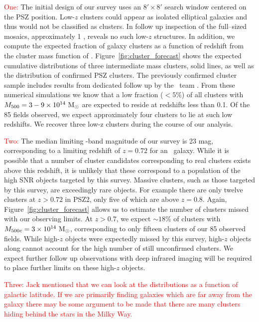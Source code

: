 \documentclass[apj, revtex4-1]{emulateapj}
\newcommand{\editorial}[1]{\textcolor{red}{#1}}
\begin{document}
\editorial{One:} The initial design of our survey uses an $8'\times8'$ search window centered on the PSZ position. Low-$z$ clusters could appear as isolated elliptical galaxies and thus would not be classified as clusters. In follow up inspection of the full--sized mosaics, approximately 1 \degsq, reveals no such low-$z$ structures. In addition, we compute the expected fraction of galaxy clusters as a function of redshift from the cluster mass function of \cite{Tinker2008}. Figure~\ref{fig:cluster_forecast} shows the expected cumulative distributions of three intermediate mass clusters, solid lines, as well as the distribution of confirmed PSZ clusters. The previously confirmed cluster sample includes results from dedicated follow up by the \planck\ team . From these numerical simulations we know that a low fraction ($<5\%$) of all clusters with $M_{500}=3-9\times10^{14}~\hbox{$\mathrm{M}_\odot$}$ are expected to reside at redshifts less than 0.1. Of the 85 fields observed, we expect approximately four clusters to lie at such low redshifts. We recover three low-z clusters during the course of our analysis.

\editorial{Two:} The median limiting \sdssi-band magnitude of our survey is 23 mag, corresponding to a limiting redshift of $z=0.72$ for an \mstar\ galaxy. While it is possible that a number of cluster candidates corresponding to real clusters exists above this redshift, it is unlikely that these correspond to a population of the high SNR objects targeted by this survey. Massive clusters, such as those targeted by this survey, are exceedingly rare objects. For example there are only twelve clusters at $z>0.72$ in PSZ2, only five of which are above $z=0.8$. Again, Figure~\ref{fig:cluster_forecast} allows us to estimate the number of clusters missed with our observing limits. At $z>0.7$, we expect $\sim18\%$ of clusters with $M_{500c}=3\times10^{14}~\hbox{$\mathrm{M}_\odot$}$, corresponding to only fifteen clusters of our 85 observed fields. While high-$z$ objects were expectedly missed by this survey, high-$z$ objects along cannot account for the high number of still unconfirmed clusters. We expect further follow up observations with deep infrared imaging will be required to place further limits on these high-$z$ objects.

\editorial{Three: Jack mentioned that we can look at the distributions as a function of galactic latitude. If we are primarily finding galaxies which are far away from the galaxy there may be some argument to be made that there are many clusters hiding behind the stars in the Milky Way.}
\end{document}
